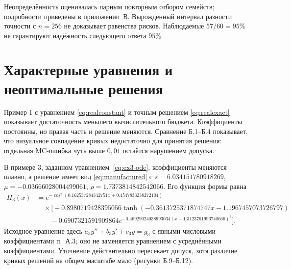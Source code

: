Неопределённость оценивалась парным повторным отбором семейств; подробности приведены в приложении~В. Вырожденный интервал разности точности с $n=256$ не доказывает равенства рисков. Наблюдаемые $57/60=95\%$ не гарантируют надёжность следующего ответа $95\%$.


\clearpage
\section{Характерные уравнения и неоптимальные решения}
Пример 1 с уравнением \eqref{eq:realconstant} и точным решением \eqref{eq:realexact} показывает достаточность меньшего вычислительного бюджета. Коэффициенты постоянны, но правая часть и решение меняются. Сравнение Б.1--Б.4 показывает, что визуальное совпадение кривых недостаточно для принятия решения: отдельная MC-ошибка чуть выше $0{,}01$ остаётся нарушением допуска.

В примере 3, заданном уравнением~\eqref{eq:ex3-ode}, коэффициенты меняются плавно, а решение имеет вид \eqref{eq:manufactured} с $s=6.034151780918269$, $\mu=-0.03666028004499061$, $\rho=1.7373814842542066$. Его функция формы равна
\begin{equation}\label{eq:example3shape}
\begin{aligned}
H_3(x)&=e^{-\cos^2(0.162537284342751x+0.4547833238272104)}\\
&\quad\times\bigl[-0.8980719428395056\tanh(-0.3613725371874747x-1.1967457073726797)\\
&\qquad-0.6907321591909864e^{-0.46929024038993034(x-1.3123761993740666)^2}\bigr].
\end{aligned}
\end{equation}
Исходное уравнение здесь $a_3y''+b_3y'+c_3y=g_3$ с явными числовыми коэффициентами п.~А.3; оно не заменяется уравнением с усреднёнными коэффициентами. Уточнение действительно пересекает допуск, хотя различие кривых решений на общем масштабе мало (рисунки Б.9--Б.12).

